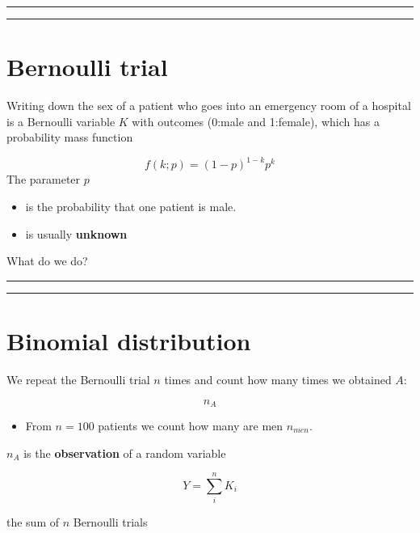 \documentclass[
]{book}
\providecommand{\tightlist}{%
  \setlength{\itemsep}{0pt}\setlength{\parskip}{0pt}}
\begin{document}
\begin{center}\rule{0.5\linewidth}{0.5pt}\end{center}

\begin{center}\rule{0.5\linewidth}{0.5pt}\end{center}

\hypertarget{bernoulli-trial-4}{%
\section{Bernoulli trial}\label{bernoulli-trial-4}}

Writing down the sex of a patient who goes into an emergency room of a hospital is a Bernoulli variable \(K\) with outcomes (0:male and 1:female), which has a probability mass function

\[f(k; p)=(1-p)^{1-k} p^k\]
The parameter \(p\)

\begin{itemize}
\item
  is the probability that one patient is male.
\item
  is usually \textbf{unknown}
\end{itemize}

What do we do?

\begin{center}\rule{0.5\linewidth}{0.5pt}\end{center}

\begin{center}\rule{0.5\linewidth}{0.5pt}\end{center}

\hypertarget{binomial-distribution-4}{%
\section{Binomial distribution}\label{binomial-distribution-4}}

We repeat the Bernoulli trial \(n\) times and count how many times we obtained \(A\):

\[n_A\]

\begin{itemize}
\tightlist
\item
  From \(n=100\) patients we count how many are men \(n_{men}\).
\end{itemize}

\(n_A\) is the \textbf{observation} of a random variable

\[Y=\sum_i^n K_i\]

the sum of \(n\) Bernoulli trials
\end{document}
